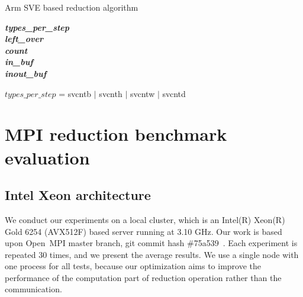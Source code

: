 \documentclass[5p,times,twocolumn]{elsarticle}
\newcommand{\ompi}[0]{Open~MPI\xspace}
\begin{document}
\begin{algorithm}[ht]
\caption{Arm SVE based reduction algorithm}\label{fig:svereducealgorithm}

\textbf{\textit{types\_per\_step}} \\
\textbf{\textit{left\_over}} \\
\textbf{\textit{count}} \\
\textbf{\textit{in\_buf}} \\
\textbf{\textit{inout\_buf}} \\

\begin{algorithmic}[1]
  \State $types\_per\_step$ = svcntb $\mid$ svcnth $\mid$ svcntw $\mid$ svcntd
\EndFor
{}
\EndIf
\EndProcedure
\end{algorithmic}
\end{algorithm}

\section{MPI reduction benchmark evaluation}\label{sec:experiments}
\subsection{Intel Xeon architecture}
We conduct our experiments on a local cluster, which is an Intel(R)
Xeon(R) Gold 6254 (AVX512F) based server running at 3.10 GHz. Our work is based
upon \ompi master branch, git commit hash \#75a539~\cite{ompigit}. Each experiment is
repeated 30 times, and we present the average results.
We use a single node with one
process for all tests, because our optimization aims to improve the performance of
the computation part of reduction operation rather than the
communication.
\end{document}
